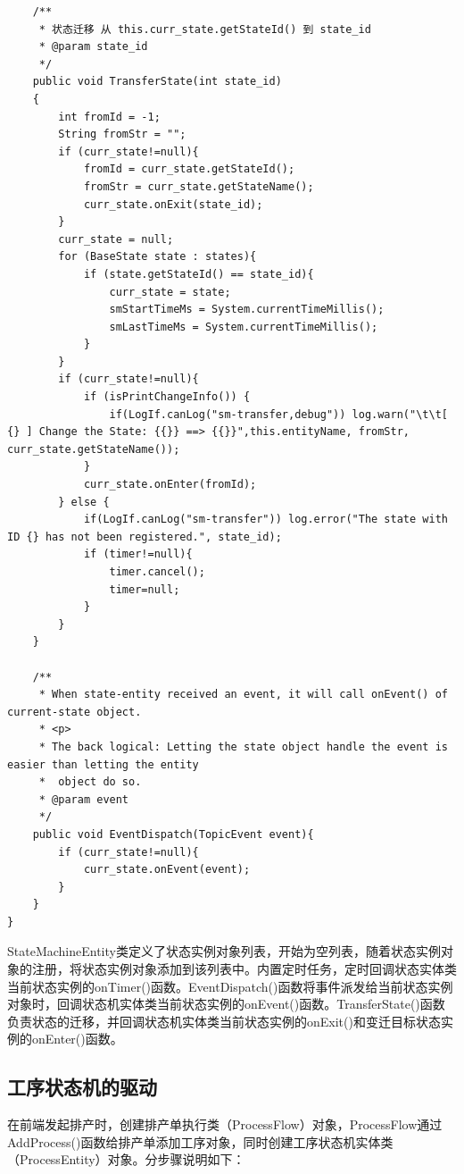 \begin{lstlisting}
    /**
     * 状态迁移 从 this.curr_state.getStateId() 到 state_id
     * @param state_id
     */
    public void TransferState(int state_id)
    {
        int fromId = -1;
        String fromStr = "";
        if (curr_state!=null){
            fromId = curr_state.getStateId();
            fromStr = curr_state.getStateName();
            curr_state.onExit(state_id);
        }
        curr_state = null;
        for (BaseState state : states){
            if (state.getStateId() == state_id){
                curr_state = state;
                smStartTimeMs = System.currentTimeMillis();
                smLastTimeMs = System.currentTimeMillis();
            }
        }
        if (curr_state!=null){
            if (isPrintChangeInfo()) {
                if(LogIf.canLog("sm-transfer,debug")) log.warn("\t\t[ {} ] Change the State: {{}} ==> {{}}",this.entityName, fromStr, curr_state.getStateName());
            }
            curr_state.onEnter(fromId);
        } else {
            if(LogIf.canLog("sm-transfer")) log.error("The state with ID {} has not been registered.", state_id);
            if (timer!=null){
                timer.cancel();
                timer=null;
            }
        }
    }

    /**
     * When state-entity received an event, it will call onEvent() of current-state object.
     * <p>
     * The back logical: Letting the state object handle the event is easier than letting the entity
     *  object do so.
     * @param event
     */
    public void EventDispatch(TopicEvent event){
        if (curr_state!=null){
            curr_state.onEvent(event);
        }
    }
}
\end{lstlisting}\vspace{-30pt}
StateMachineEntity类定义了状态实例对象列表，开始为空列表，随着状态实例对象的注册，将状态实例对象添加到该列表中。内置定时任务，定时回调状态实体类当前状态实例的onTimer()函数。EventDispatch()函数将事件派发给当前状态实例对象时，回调状态机实体类当前状态实例的onEvent()函数。TransferState()函数负责状态的迁移，并回调状态机实体类当前状态实例的onExit()和变迁目标状态实例的onEnter()函数。

\subsection {工序状态机的驱动}
在前端发起排产时，创建排产单执行类（ProcessFlow）对象，ProcessFlow通过AddProcess()函数给排产单添加工序对象，同时创建工序状态机实体类（ProcessEntity）对象。分步骤说明如下：
